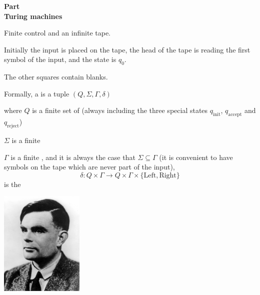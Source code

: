 
\newcommand{\mytitle}{Computational Foundations \\ Section 9.5}
\newcommand{\mychpnr}{9}


\begin{frame}
\begin{center}
\addtocounter{part}{1}
{\bf Part  \\ Turing machines}
\end{center}
\end{frame}

\begin{frame}
Finite control and an infinite tape.

Initially the input is placed on the tape, the head of the tape is
reading the first symbol of the input, and the state is $q_0$.

The other squares contain blanks.

Formally, a  is a tuple 
$(Q,\Sigma,\Gamma,\delta)$

where $Q$ is a finite set of  (always
including the three special states $q_{\text{init}}$,
$q_{\text{accept}}$ and
$q_{\text{reject}}$)

$\Sigma$ is a finite  

$\Gamma$ is a finite , and it is always the case that $\Sigma\subseteq\Gamma$ (it
is convenient to have symbols on the tape which are never part of the
input),
$$
\delta:Q\times\Gamma\rightarrow
Q\times\Gamma\times\{\text{Left},\text{Right}\}
$$ 
is the 
\end{frame}

\begin{frame}
\begin{minipage}{5cm}
\includegraphics[width=4cm]{figures/AlanTuring.jpg}
\end{minipage}
\begin{minipage}{5cm}
 \\
\end{minipage}
\end{frame}


